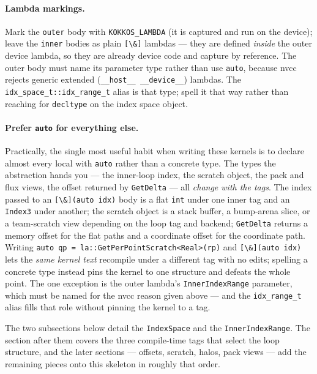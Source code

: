 \documentclass[11pt]{article}
\newcommand{\code}[1]{\lstinline[basicstyle=\ttfamily]|#1|}
\begin{document}
\paragraph{Lambda markings.} Mark the \code{outer} body with \code{KOKKOS_LAMBDA}
(it is captured and run on the device); leave the \code{inner} bodies as plain
\code{[\&]} lambdas --- they are defined \emph{inside} the outer device lambda, so
they are already device code and capture by reference. The outer body must name its
parameter type rather than use \code{auto}, because nvcc rejects generic extended
(\code{__host__ __device__}) lambdas. The \code{idx_space_t::idx_range_t} alias is
that type; spell it that way rather than reaching for \code{decltype} on the index
space object.

\paragraph{Prefer \code{auto} for everything else.} Practically, the single most
useful habit when writing these kernels is to declare almost every local with
\code{auto} rather than a concrete type. The types the abstraction hands you ---
the inner-loop index, the scratch object, the pack and flux views, the offset
returned by \code{GetDelta} --- all \emph{change with the tags}. The index passed
to an \code{[\&](auto idx)} body is a flat \code{int} under one inner tag and an
\code{Index3} under another; the scratch object is a stack buffer, a bump-arena
slice, or a team-scratch view depending on the loop tag and backend; \code{GetDelta}
returns a memory offset for the flat paths and a coordinate offset for the
coordinate path. Writing \code{auto qp = la::GetPerPointScratch<Real>(rp)} and
\code{[\&](auto idx)} lets the \emph{same kernel text} recompile under a different
tag with no edits; spelling a concrete type instead pins the kernel to one
structure and defeats the whole point. The one exception is the outer lambda's
\code{InnerIndexRange} parameter, which must be named for the nvcc reason given
above --- and the \code{idx_range_t} alias fills that role without pinning the
kernel to a tag.

The two subsections below detail the \code{IndexSpace} and the
\code{InnerIndexRange}. The section after them covers the three compile-time tags
that select the loop structure, and the later sections --- offsets, scratch,
halos, pack views --- add the remaining pieces onto this skeleton in roughly that
order.

\end{document}
